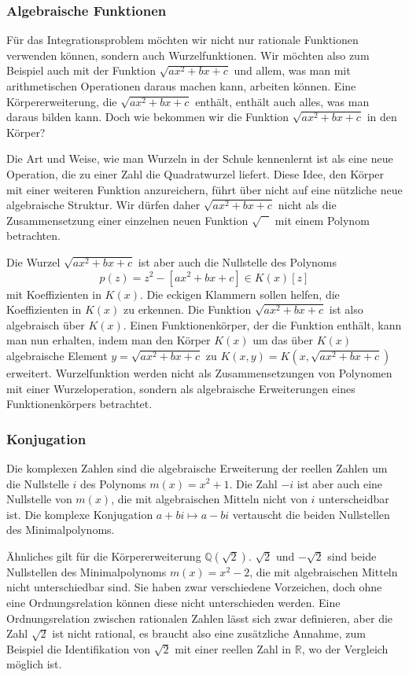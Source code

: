 %
%
\subsubsection{Algebraische Funktionen}
Für das Integrationsproblem möchten wir nicht nur rationale Funktionen
verwenden können, sondern auch Wurzelfunktionen.
Wir möchten also zum Beispiel auch mit der Funktion $\sqrt{ax^2+bx+c}$
und allem, was man mit arithmetischen Operationen daraus machen kann,
arbeiten können.
Eine Körpererweiterung, die $\sqrt{ax^2+bx+c}$ enthält, enthält auch
alles, was man daraus bilden kann.
Doch wie bekommen wir die Funktion $\sqrt{ax^2+bx+c}$ in den Körper?

Die Art und Weise, wie man Wurzeln in der Schule kennenlernt ist als
eine neue Operation, die zu einer Zahl die Quadratwurzel liefert.
Diese Idee, den Körper mit einer weiteren Funktion anzureichern,
führt über nicht auf eine nützliche neue algebraische Struktur.
Wir dürfen daher $\sqrt{ax^2+bx+c}$ nicht als die Zusammensetzung
einer einzelnen neuen Funktion $\sqrt{\phantom{A}}$ mit
einem Polynom betrachten.

Die Wurzel $\sqrt{ax^2+bx+c}$ ist aber auch die Nullstelle des Polynoms
\[
p(z)
=
z^2 - [ax^2+bx+c]
\in
K(x)[z]
\]
mit Koeffizienten in $K(x)$.
Die eckigen Klammern sollen helfen, die Koeffizienten in $K(x)$
zu erkennen.
Die Funktion $\sqrt{ax^2+bx+c}$ ist also algebraisch über $K(x)$.
Einen Funktionenkörper, der die Funktion enthält, kann man nun erhalten,
indem man den Körper $K(x)$ um das über $K(x)$ algebraische Element
$y=\sqrt{ax^2+bx+c}$ zu $K(x,y)=K(x,\sqrt{ax^2+bx+c})$ erweitert.
Wurzelfunktion werden nicht als Zusammensetzungen von Polynomen
mit einer Wurzeloperation, sondern als
algebraische Erweiterungen eines Funktionenkörpers betrachtet.

%
%
\subsubsection{Konjugation}
Die komplexen Zahlen sind die algebraische Erweiterung der reellen Zahlen
um die Nullstelle $i$ des Polynoms $m(x)=x^2+1$.
Die Zahl $-i$ ist aber auch eine Nullstelle von $m(x)$, die mit algebraischen
Mitteln nicht von $i$ unterscheidbar ist.
Die komplexe Konjugation $a+bi\mapsto a-bi$ vertauscht die beiden 
%
%
Nullstellen des Minimalpolynoms.

Ähnliches gilt für die Körpererweiterung $\mathbb{Q}(\!\sqrt{2})$.
$\sqrt{2}$ und $-\sqrt{2}$ sind beide Nullstellen des Minimalpolynoms
$m(x)=x^2-2$, die mit algebraischen Mitteln nicht unterschiedbar sind.
Sie haben zwar verschiedene Vorzeichen, doch ohne eine Ordnungsrelation
können diese nicht unterschieden werden.
%
Eine Ordnungsrelation zwischen rationalen Zahlen lässt sich zwar
definieren, aber die Zahl $\sqrt{2}$ ist nicht rational, es braucht
also eine zusätzliche Annahme, zum Beispiel die Identifikation von
$\sqrt{2}$ mit einer reellen Zahl in $\mathbb{R}$, wo der Vergleich
möglich ist.

